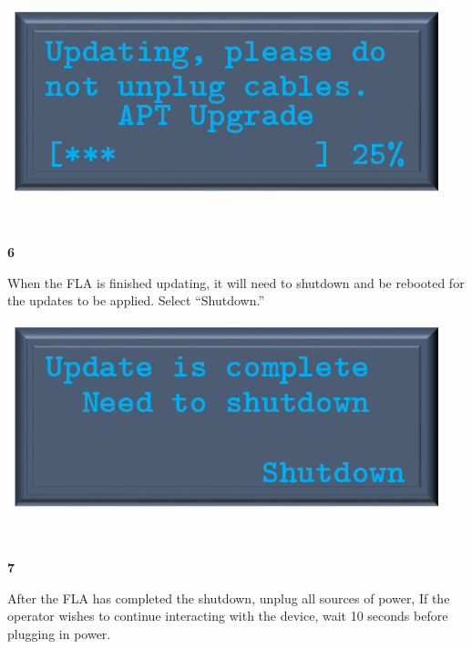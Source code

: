\documentclass[11pt, oneside]{book}
\begin{document}
\hfill%
\begin{minipage}{0.45\textwidth} 
	\includegraphics[width=\linewidth]{../media/pstricks_files/07_update_apt}
\end{minipage}\\[\baselineskip]
\noindent\begin{minipage}{0.45\textwidth}%
	\begin{center}
		\textbf{6}
	\end{center}
	When the FLA is finished updating, it will need to shutdown and be rebooted for the updates to be applied. Select ``Shutdown.''
\end{minipage}%
\hfill%
\begin{minipage}{0.45\textwidth} 
	\includegraphics[width=\linewidth]{../media/pstricks_files/07_update_complete}
\end{minipage}\\[\baselineskip]
\noindent\begin{minipage}{0.45\textwidth}%
	\begin{center}
		\textbf{7}
	\end{center}
	After the FLA has completed the shutdown, unplug all sources of power, If the operator wishes to continue interacting with the device, wait 10 seconds before plugging in power.
\end{minipage}%
\hfill%
\end{document}
